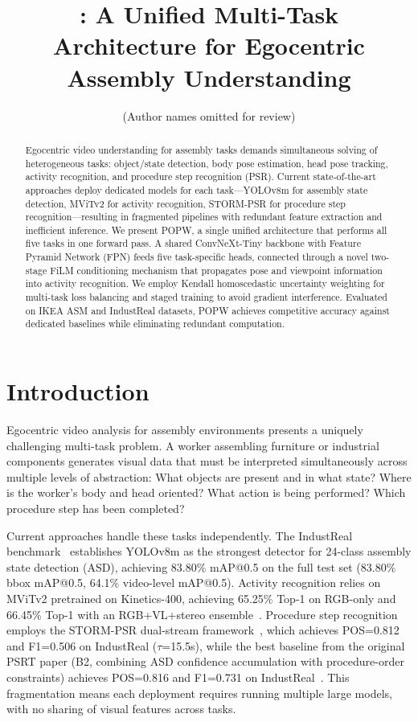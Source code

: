 \documentclass[11pt,a4paper]{article}
\title{\popw{}: A Unified Multi-Task Architecture for Egocentric Assembly Understanding}
\author{(Author names omitted for review)}
\date{}
\newcommand{\popw}{POPW}
\begin{document}
\maketitle

\begin{abstract}
Egocentric video understanding for assembly tasks demands simultaneous solving of heterogeneous tasks: object/state detection, body pose estimation, head pose tracking, activity recognition, and procedure step recognition (PSR). Current state-of-the-art approaches deploy dedicated models for each task---YOLOv8m for assembly state detection, MViTv2 for activity recognition, STORM-PSR for procedure step recognition---resulting in fragmented pipelines with redundant feature extraction and inefficient inference. We present \popw{}, a single unified architecture that performs all five tasks in one forward pass. A shared ConvNeXt-Tiny backbone with Feature Pyramid Network (FPN) feeds five task-specific heads, connected through a novel two-stage FiLM conditioning mechanism that propagates pose and viewpoint information into activity recognition. We employ Kendall homoscedastic uncertainty weighting for multi-task loss balancing and staged training to avoid gradient interference. Evaluated on IKEA ASM and IndustReal datasets, \popw{} achieves competitive accuracy against dedicated baselines while eliminating redundant computation.
\end{abstract}

\section{Introduction}
\label{sec:intro}

Egocentric video analysis for assembly environments presents a uniquely challenging multi-task problem. A worker assembling furniture or industrial components generates visual data that must be interpreted simultaneously across multiple levels of abstraction: What objects are present and in what state? Where is the worker's body and head oriented? What action is being performed? Which procedure step has been completed?

Current approaches handle these tasks independently. The IndustReal benchmark~\cite{schoonbeek2024industreal} establishes YOLOv8m as the strongest detector for 24-class assembly state detection (ASD), achieving 83.80\% mAP@0.5 on the full test set (83.80\% bbox mAP@0.5, 64.1\% video-level mAP@0.5). Activity recognition relies on MViTv2 pretrained on Kinetics-400, achieving 65.25\% Top-1 on RGB-only and 66.45\% Top-1 with an RGB+VL+stereo ensemble~\cite{schoonbeek2024industreal}. Procedure step recognition employs the STORM-PSR dual-stream framework~\cite{schoonbeek2025storm}, which achieves POS=0.812 and F1=0.506 on IndustReal ($\tau$=15.5s), while the best baseline from the original PSRT paper (B2, combining ASD confidence accumulation with procedure-order constraints) achieves POS=0.816 and F1=0.731 on IndustReal~\cite{schoonbeek2024industreal}. This fragmentation means each deployment requires running multiple large models, with no sharing of visual features across tasks.
\end{document}

